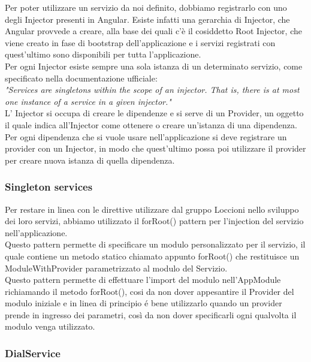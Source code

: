 Per poter utilizzare un servizio da noi definito, dobbiamo registrarlo con uno degli Injector presenti in Angular. Esiste infatti una gerarchia di Injector, che Angular provvede a creare, alla base dei quali c'è il cosiddetto Root Injector, che viene creato in fase di bootstrap dell’applicazione e i servizi registrati con quest’ultimo sono disponibili per tutta l’applicazione.\\

Per ogni Injector esiste sempre una sola istanza di un determinato servizio, come specificato nella documentazione ufficiale:\\

\emph{"Services are singletons within the scope of an injector. That is, there is at most one instance of a service in a given injector."}\\

L’ Injector si occupa di creare le dipendenze e si serve di un Provider, un oggetto il quale indica all'Injector come ottenere o creare un'istanza di una dipendenza.
Per ogni dipendenza che si vuole usare nell'applicazione si deve registrare un provider con un Injector, in modo che quest'ultimo possa poi utilizzare il provider per creare nuova istanza di quella dipendenza.

\subsubsection{Singleton services}

Per restare in linea con le direttive utilizzare dal gruppo Loccioni nello sviluppo dei loro servizi, abbiamo utilizzato il forRoot() pattern per l’injection del servizio nell’applicazione.\\

Questo pattern permette di specificare un modulo personalizzato per il servizio, il quale contiene un metodo statico chiamato appunto forRoot() che restituisce un ModuleWithProvider parametrizzato al modulo del Servizio.\\

Questo pattern permette di effettuare l’import del modulo nell’AppModule richiamando il metodo forRoot(), cosi da non dover appesantire il Provider del modulo iniziale e in linea di principio é bene utilizzarlo quando un provider prende in ingresso dei parametri, così da non dover specificarli ogni qualvolta il modulo venga utilizzato.

\subsubsection{DialService}

